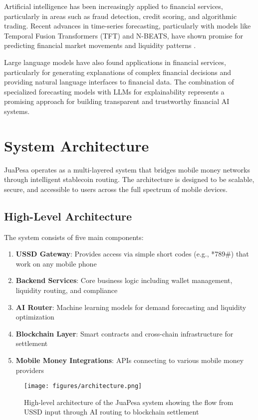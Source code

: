 \documentclass[11pt,a4paper]{article}
\begin{document}
Artificial intelligence has been increasingly applied to financial services, particularly in areas such as fraud detection, credit scoring, and algorithmic trading. Recent advances in time-series forecasting, particularly with models like Temporal Fusion Transformers (TFT) and N-BEATS, have shown promise for predicting financial market movements and liquidity patterns \cite{lim2021}.

Large language models have also found applications in financial services, particularly for generating explanations of complex financial decisions and providing natural language interfaces to financial data. The combination of specialized forecasting models with LLMs for explainability represents a promising approach for building transparent and trustworthy financial AI systems.

\section{System Architecture}

JuaPesa operates as a multi-layered system that bridges mobile money networks through intelligent stablecoin routing. The architecture is designed to be scalable, secure, and accessible to users across the full spectrum of mobile devices.

\subsection{High-Level Architecture}

The system consists of five main components:

\begin{enumerate}
    \item \textbf{USSD Gateway}: Provides access via simple short codes (e.g., *789#) that work on any mobile phone
    \item \textbf{Backend Services}: Core business logic including wallet management, liquidity routing, and compliance
    \item \textbf{AI Router}: Machine learning models for demand forecasting and liquidity optimization
    \item \textbf{Blockchain Layer}: Smart contracts and cross-chain infrastructure for settlement
    \item \textbf{Mobile Money Integrations}: APIs connecting to various mobile money providers
\end{enumerate}

\begin{figure}[h]
\centering
\texttt{[image: figures/architecture.png]}
\caption{High-level architecture of the JuaPesa system showing the flow from USSD input through AI routing to blockchain settlement}
\label{fig:architecture}
\end{figure}
\end{document}
